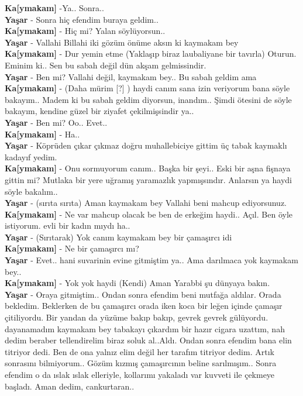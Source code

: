\documentclass[]{book}
\begin{document}
\textbf{Ka{[}ymakam{]}} -Ya.. Sonra..\\
\textbf{Yaşar} - Sonra hiç efendim buraya geldim..\\
\textbf{Ka{[}ymakam{]}} - Hiç mi? Yalan söylüyorsun..\\
\textbf{Yaşar} - Vallahi Billahi iki gözüm önüme aksın ki kaymakam bey\\
\textbf{Ka{[}ymakam{]}} - Dur yemin etme (Yaklaşıp biraz laubaliyane bir tavırla) Oturun. Eminim ki.. Sen bu sabah değil dün akşam gelmissindir.\\
\textbf{Yaşar} - Ben mi? Vallahi değil, kaymakam bey.. Bu sabah geldim ama\\
\textbf{Ka{[}ymakam{]}} - (Daha mürim {[}?{]} ) haydi canım sana izin veriyorum bana söyle bakayım.. Madem ki bu sabah geldim diyorsun, inandım.. Şimdi ötesini de söyle bakayım, kendine güzel bir ziyafet çekilmişsindir ya..\\
\textbf{Yaşar} - Ben mi? Oo.. Evet..\\
\textbf{Ka{[}ymakam{]}} - Ha..\\
\textbf{Yaşar} - Köprüden çıkar çıkmaz doğru muhallebiciye gittim üç tabak kaymaklı kadayıf yedim.\\
\textbf{Ka{[}ymakam{]}} - Onu sormuyorum canım.. Başka bir şeyi.. Eski bir aşna fişnaya gittin mi? Mutlaka bir yere uğramış yaramazlık yapmışsındır. Anlarsın ya haydi söyle bakalım..\\
\textbf{Yaşar} - (sırıta sırıta) Aman kaymakam bey Vallahi beni mahcup ediyorsunuz.\\
\textbf{Ka{[}ymakam{]}} - Ne var mahcup olacak be ben de erkeğim haydi.. Açıl. Ben öyle istiyorum. evli bir kadın mıydı ha..\\
\textbf{Yaşar} - (Sırıtarak) Yok canım kaymakam bey bir çamaşırcı idi\\
\textbf{Ka{[}ymakam{]}} - Ne bir çamaşırcı mı?\\
\textbf{Yaşar} - Evet.. hani suvarinin evine gitmiştim ya.. Ama darılmaca yok kaymakam bey..\\
\textbf{Ka{[}ymakam{]}} - Yok yok haydi (Kendi) Aman Yarabbi şu dünyaya bakın.\\
\textbf{Yaşar} - Oraya gitmiştim.. Ondan sonra efendim beni mutfağa aldılar. Orada bekledim. Beklerken de bu çamaşırcı orada iken koca bir leğen içinde çamaşır çitiliyordu. Bir yandan da yüzüme bakıp bakıp, gevrek gevrek gülüyordu. dayanamadım kaymakam bey tabakayı çıkardım bir hazır cigara uzattım, nah dedim beraber tellendirelim biraz soluk al..Aldı. Ondan sonra efendim bana elin titriyor dedi. Ben de ona yalnız elim değil her tarafım titriyor dedim. Artık sonrasını bilmiyorum.. Gözüm kızmış çamaşırcının beline sarılmışım.. Sonra efendim o da ıslak ıslak elleriyle, kollarımı yakaladı var kuvveti ile çekmeye başladı. Aman dedim, cankurtaran..\\
\end{document}
